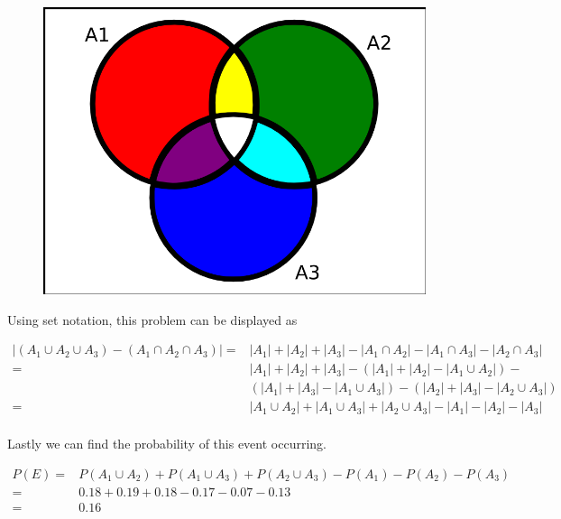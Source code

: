 \documentclass[10pt]{article}
\begin{document}
\begin{easylist}[enumerate]
        \begin{figure}[!ht]
            \centering
            \includegraphics[scale=0.3]{./img/ps3_4.png}
        \end{figure}

        Using set notation, this problem can be displayed as

        \[ \begin{aligned}
            |(A_1 \cup A_2 \cup A_3) - (A_1 \cap A_2 \cap A_3)| =& |A_1| + |A_2| + |A_3| - |A_1 \cap A_2| - |A_1 \cap A_3| - |A_2 \cap A_3|\\
                                                                =& |A_1| + |A_2| + |A_3| - (|A_1| + |A_2| - |A_1 \cup A_2|) -\\
                                                                 & (|A_1| + |A_3| - |A_1 \cup A_3|) - (|A_2| + |A_3| - |A_2 \cup A_3|)\\
                                                                =& |A_1 \cup A_2| + |A_1 \cup A_3| + |A_2 \cup A_3| - |A_1| - |A_2| - |A_3|\\
        \end{aligned} \]

        Lastly we can find the probability of this event occurring.

        \[ \begin{aligned}
                P(E) =& P(A_1 \cup A_2) + P(A_1 \cup A_3) + P(A_2 \cup A_3) - P(A_1) - P(A_2) - P(A_3)\\
                     =& 0.18 + 0.19 + 0.18 - 0.17 - 0.07 - 0.13\\
                     =& \boxed{0.16}
            \end{aligned}
        \]

\end{easylist}
\end{document}
